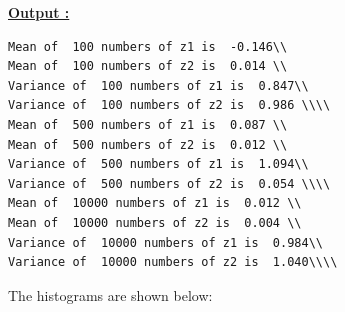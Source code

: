 \documentclass[12pt]{book}
\begin{document}
\newpage
\underline{\textbf{Output :}}\\
\begin{lstlisting}
Mean of  100 numbers of z1 is  -0.146\\ 
Mean of  100 numbers of z2 is  0.014 \\
Variance of  100 numbers of z1 is  0.847\\ 
Variance of  100 numbers of z2 is  0.986 \\\\
Mean of  500 numbers of z1 is  0.087 \\
Mean of  500 numbers of z2 is  0.012 \\
Variance of  500 numbers of z1 is  1.094\\ 
Variance of  500 numbers of z2 is  0.054 \\\\
Mean of  10000 numbers of z1 is  0.012 \\
Mean of  10000 numbers of z2 is  0.004 \\
Variance of  10000 numbers of z1 is  0.984\\ 
Variance of  10000 numbers of z2 is  1.040\\\\
\end{lstlisting}
\newpage
The histograms are shown below:
\begin{figure}[H]
	\centering
\end{figure}
\begin{figure}[H]
	\centering
\end{figure}
\end{document}
